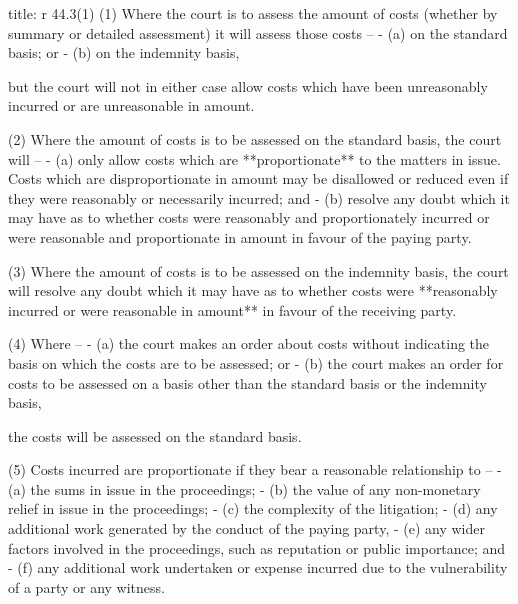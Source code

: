 \documentclass[
]{article}
\newenvironment{Shaded}{}{}
\newcommand{\NormalTok}[1]{#1}
\begin{document}
\begin{Shaded}
\begin{Highlighting}[]
\NormalTok{title: r 44.3(1)}
\NormalTok{(1) Where the court is to assess the amount of costs (whether by summary or detailed assessment) it will assess those costs –}
\NormalTok{{-} (a) on the standard basis; or}
\NormalTok{{-} (b) on the indemnity basis,}

\NormalTok{but the court will not in either case allow costs which have been unreasonably incurred or are unreasonable in amount.}

\NormalTok{(2) Where the amount of costs is to be assessed on the standard basis, the court will –}
\NormalTok{{-} (a) only allow costs which are **proportionate** to the matters in issue. Costs which are disproportionate in amount may be disallowed or reduced even if they were reasonably or necessarily incurred; and}
\NormalTok{{-} (b) resolve any doubt which it may have as to whether costs were reasonably and proportionately incurred or were reasonable and proportionate in amount in favour of the paying party.}

\NormalTok{(3) Where the amount of costs is to be assessed on the indemnity basis, the court will resolve any doubt which it may have as to whether costs were **reasonably incurred or were reasonable in amount** in favour of the receiving party.}

\NormalTok{(4) Where –}
\NormalTok{{-} (a) the court makes an order about costs without indicating the basis on which the costs are to be assessed; or}
\NormalTok{{-} (b) the court makes an order for costs to be assessed on a basis other than the standard basis or the indemnity basis,}

\NormalTok{the costs will be assessed on the standard basis.}

\NormalTok{(5) Costs incurred are proportionate if they bear a reasonable relationship to –}
\NormalTok{{-} (a) the sums in issue in the proceedings;}
\NormalTok{{-} (b) the value of any non{-}monetary relief in issue in the proceedings;}
\NormalTok{{-} (c) the complexity of the litigation;}
\NormalTok{{-} (d) any additional work generated by the conduct of the paying party,}
\NormalTok{{-} (e) any wider factors involved in the proceedings, such as reputation or public importance; and}
\NormalTok{{-} (f) any additional work undertaken or expense incurred due to the vulnerability of a party or any witness.}
\end{Highlighting}
\end{Shaded}
\end{document}
